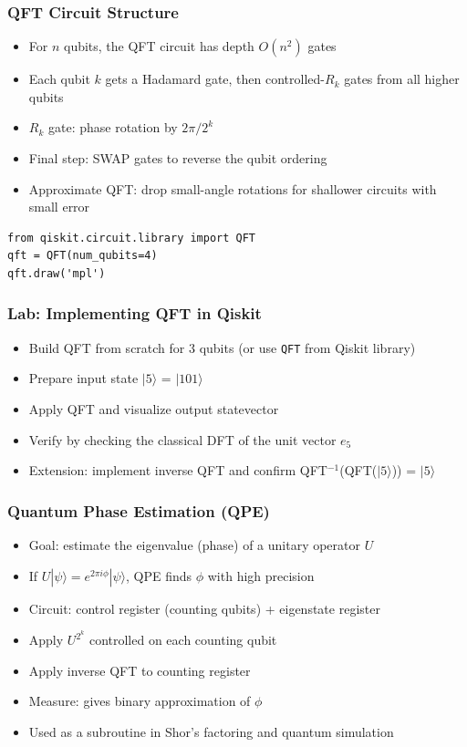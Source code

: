 \begin{frame}[fragile]\frametitle{QFT Circuit Structure}
\begin{itemize}
\item For $n$ qubits, the QFT circuit has depth $O(n^2)$ gates
\item Each qubit $k$ gets a Hadamard gate, then controlled-$R_k$ gates from all higher qubits
\item $R_k$ gate: phase rotation by $2\pi/2^k$
\item Final step: SWAP gates to reverse the qubit ordering
\item Approximate QFT: drop small-angle rotations for shallower circuits with small error
\end{itemize}
\begin{verbatim}
from qiskit.circuit.library import QFT
qft = QFT(num_qubits=4)
qft.draw('mpl')
\end{verbatim}
\end{frame}

\begin{frame}[fragile]\frametitle{Lab: Implementing QFT in Qiskit}
\begin{itemize}
\item Build QFT from scratch for 3 qubits (or use \texttt{QFT} from Qiskit library)
\item Prepare input state $|5\rangle$ = $|101\rangle$
\item Apply QFT and visualize output statevector
\item Verify by checking the classical DFT of the unit vector $e_5$
\item Extension: implement inverse QFT and confirm QFT$^{-1}$(QFT($|5\rangle$)) = $|5\rangle$
\end{itemize}
\end{frame}

\begin{frame}[fragile]\frametitle{Quantum Phase Estimation (QPE)}
\begin{itemize}
\item Goal: estimate the eigenvalue (phase) of a unitary operator $U$
\item If $U|\psi\rangle = e^{2\pi i \phi}|\psi\rangle$, QPE finds $\phi$ with high precision
\item Circuit: control register (counting qubits) + eigenstate register
\item Apply $U^{2^k}$ controlled on each counting qubit
\item Apply inverse QFT to counting register
\item Measure: gives binary approximation of $\phi$
\item Used as a subroutine in Shor's factoring and quantum simulation
\end{itemize}
\end{frame}

